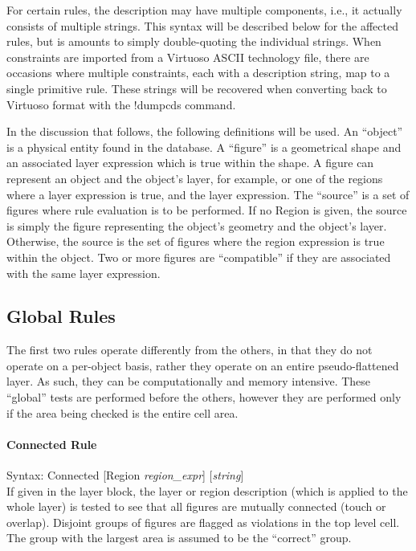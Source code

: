 For certain rules, the description may have multiple components, i.e.,
it actually consists of multiple strings.  This syntax will be
described below for the affected rules, but is amounts to simply
double-quoting the individual strings.  When constraints are imported
from a Virtuoso ASCII technology file, there are occasions where
multiple constraints, each with a description string, map to a single
{\Xic} primitive rule.  These strings will be recovered when
converting back to Virtuoso format with the {\cb !dumpcds} command.

In the discussion that follows, the following definitions will be
used.  An ``object'' is a physical entity found in the database.  A
``figure'' is a geometrical shape and an associated layer expression
which is true within the shape.  A figure can represent an object and
the object's layer, for example, or one of the regions where a layer
expression is true, and the layer expression.  The ``source'' is a set
of figures where rule evaluation is to be performed.  If no {\et
Region} is given, the source is simply the figure representing the
object's geometry and the object's layer.  Otherwise, the source is
the set of figures where the region expression is true within the
object.  Two or more figures are ``compatible'' if they are associated
with the same layer expression.

\subsection{Global Rules}

The first two rules operate differently from the others, in that they
do not operate on a per-object basis, rather they operate on an entire
pseudo-flattened layer.  As such, they can be computationally and
memory intensive.  These ``global'' tests are performed before the
others, however they are performed only if the area being checked is
the entire cell area.


\paragraph{{\et Connected} Rule}

\begin{description}
\item{Syntax: {\vt Connected} [{\vt Region} {\it region\_expr\/}]
 [{\it string\/}]}\\

If given in the layer block, the layer or region description (which is
applied to the whole layer) is tested to see that all figures are
mutually connected (touch or overlap).  Disjoint groups of figures are
flagged as violations in the top level cell.  The group with the
largest area is assumed to be the ``correct'' group.
\end{description}

